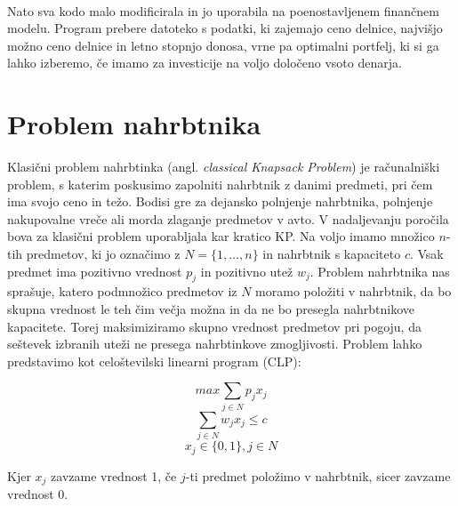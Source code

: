 \documentclass[a4paper,12pt]{article}
\theoremstyle{definition}
\begin{document}
\paragraph{}
Nato sva kodo malo modificirala in jo uporabila na poenostavljenem finančnem modelu. 
Program prebere datoteko s podatki, ki zajemajo ceno delnice, najvišjo možno ceno delnice in letno stopnjo donosa, vrne pa 
optimalni portfelj, ki si ga lahko izberemo, če imamo za investicije na voljo  določeno vsoto denarja.




\newpage
\section{Problem nahrbtnika}
\medskip
Klasični problem nahrbtinka (angl. \textit{classical Knapsack Problem}) je računalniški problem, s katerim poskusimo zapolniti 
nahrbtnik z danimi predmeti, pri čem ima svojo ceno in težo. Bodisi gre za dejansko polnjenje nahrbtnika, polnjenje 
nakupovalne vreče ali morda zlaganje predmetov v avto. V nadaljevanju poročila bova za klasični problem uporabljala kar kratico KP. 
Na voljo imamo množico $n$-tih predmetov, ki jo označimo z $N = \{1, \dots, n\}$ in nahrbtnik s kapaciteto $c$. Vsak predmet ima 
pozitivno vrednost $p_{j}$ in pozitivno utež $w_{j}$. Problem nahrbtnika nas sprašuje, katero podmnožico predmetov iz $N$ moramo 
položiti v nahrbtnik, da bo skupna vrednost le teh čim večja možna in da ne bo presegla nahrbtnikove kapacitete. 
Torej maksimiziramo skupno vrednost predmetov pri pogoju, da seštevek izbranih uteži ne presega nahrbtinkove zmogljivosti.
Problem lahko predstavimo kot celoštevilski linearni program (CLP):


\begin{equation}
    \tag*{}
     max \sum_{j \in N} p_{j}x_{j}
\end{equation}
\begin{equation}
    \tag*{}
    \sum_{j \in N} w_{j}x_{j} \leq c
\end{equation}
\begin{equation}
    \tag*{}
    x_{j} \in \{0,1\}, j \in N
\end{equation}

\medskip
\noindent Kjer $x_{j}$ zavzame vrednost 1, če $j$-ti predmet položimo v nahrbtnik,
 sicer zavzame vrednost 0. 
\end{document}
